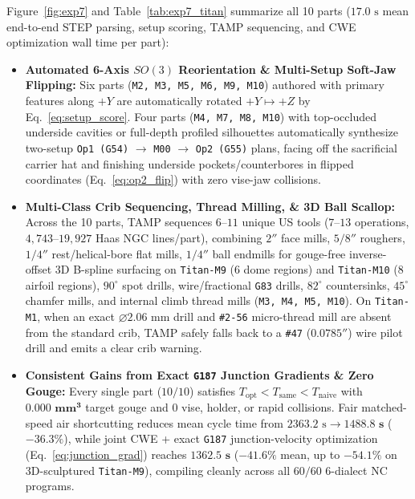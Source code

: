 \documentclass[conference]{IEEEtran}
\begin{document}
Figure~\ref{fig:exp7} and Table~\ref{tab:exp7_titan} summarize all 10 parts ($17.0\text{ s}$ mean end-to-end STEP parsing, setup scoring, TAMP sequencing, and CWE optimization wall time per part):
\begin{itemize}
  \item \textbf{Automated 6-Axis $SO(3)$ Reorientation \& Multi-Setup Soft-Jaw Flipping:} Six parts (\texttt{M2, M3, M5, M6, M9, M10}) authored with primary features along $+Y$ are automatically rotated $+Y \mapsto +Z$ by Eq.~\eqref{eq:setup_score}. Four parts (\texttt{M4, M7, M8, M10}) with top-occluded underside cavities or full-depth profiled silhouettes automatically synthesize two-setup \texttt{Op1 (G54)} $\to$ \texttt{M00} $\to$ \texttt{Op2 (G55)} plans, facing off the sacrificial carrier hat and finishing underside pockets/counterbores in flipped coordinates (Eq.~\eqref{eq:op2_flip}) with zero vise-jaw collisions.
  \item \textbf{Multi-Class Crib Sequencing, Thread Milling, \& 3D Ball Scallop:} Across the 10 parts, TAMP sequences $6$--$11$ unique US tools ($7$--$13$ operations, $4{,}743$--$19{,}927$ Haas NGC lines/part), combining $2''$ face mills, $5/8''$ roughers, $1/4''$ rest/helical-bore flat mills, $1/4''$ ball endmills for gouge-free inverse-offset 3D B-spline surfacing on \texttt{Titan-M9} ($6$ dome regions) and \texttt{Titan-M10} ($8$ airfoil regions), $90^\circ$ spot drills, wire/fractional \texttt{G83} drills, $82^\circ$ countersinks, $45^\circ$ chamfer mills, and internal climb thread mills (\texttt{M3, M4, M5, M10}). On \texttt{Titan-M1}, when an exact $\varnothing 2.06\text{ mm}$ drill and \texttt{\#2-56} micro-thread mill are absent from the standard crib, TAMP safely falls back to a \texttt{\#47} ($0.0785''$) wire pilot drill and emits a clear crib warning.
  \item \textbf{Consistent Gains from Exact \texttt{G187} Junction Gradients \& Zero Gouge:} Every single part ($10/10$) satisfies $T_{\text{opt}} < T_{\text{same}} < T_{\text{naive}}$ with $\mathbf{0.000\text{ mm}^3}$ target gouge and $0$ vise, holder, or rapid collisions. Fair matched-speed air shortcutting reduces mean cycle time from $2363.2\text{ s} \to \mathbf{1488.8\text{ s}}$ ($\mathbf{-36.3\%}$), while joint CWE + exact \texttt{G187} junction-velocity optimization (Eq.~\eqref{eq:junction_grad}) reaches $\mathbf{1362.5\text{ s}}$ ($\mathbf{-41.6\%}$ mean, up to $\mathbf{-54.1\%}$ on 3D-sculptured \texttt{Titan-M9}), compiling cleanly across all $60/60$ 6-dialect NC programs.
\end{itemize}
\end{document}
